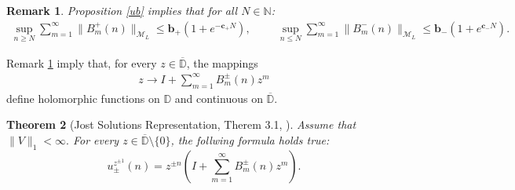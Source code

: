 \documentclass[12pt,oneside,onecolumn,open]{article}
\newtheorem{teo}{Theorem}[section]
\newtheorem{obs}[teo]{Remark}
\begin{document}
\begin{obs}\label{remSumBs}
Proposition \ref{ub} implies that for all  $N \in \mathbb{N}$:
\begin{align}\label{AUbound}
    \sup_{n \geq N}   \sum _{m=1}^{\infty }\|B^{+}_m(n)\|_{\mathcal{M}_L}  \leq  \mathbf{b}_{+} (1 +  e^{ - \mathbf{c}_{+}  N}),  \hspace{1cm}   \sup_{n \leq N}   \sum _{m=1}^{\infty }\|B^{-}_m(n)\|_{\mathcal{M}_L} \leq  \mathbf{b}_{-} (1 +  e^{  \mathbf{c}_{-}  N}) .   \end{align}



\end{obs}

\color{black}




Remark \ref{remSumBs} imply that, for every $z\in \overline{\mathbb{D}}$, the mappings
\begin{align}
    z \to I+\sum _{m=1}^{\infty }{B_{m}^{\pm  }(n)z^{m}}
\end{align}
define  holomorphic functions on $\mathbb{D}$ and continuous on $\overline{\mathbb{D}}$. \color{black}
\begin{teo}[Jost Solutions Representation, Therem 3.1, \cite{sher2025scatteringtheorydifferenceequations}]\label{JSR} 
Assume that $\|  V\|_1  < \infty.$ For every $z\in \overline{\mathbb{D}}  \setminus \{ 0 \}$, the follwing formula holds true:
    \begin{equation}
        \label{eq:taylor+}
        u_{\pm }^{z^{\pm 1}}(n)=z^{\pm n}\left(I+\sum _{m=1}^{\infty }{B_{m}^{\pm  }(n)z^{m}}\right).  
    \end{equation}
\label{teo:jsrepresentation}
\end{teo}

\end{document}
